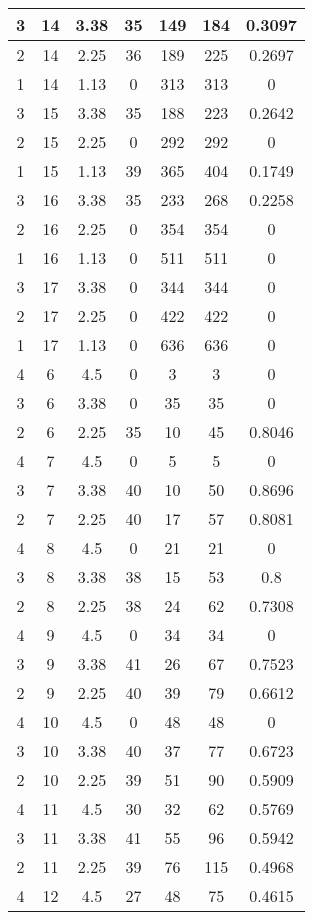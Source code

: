 \documentclass[letterpaper, 12pt]{article}
\begin{document}
\begin{longtable}{|c|c|c|c|c|c|c|}
\hline
3 & 14 & 3.38 & 35 & 149 & 184 & 0.3097 \\
\hline
2 & 14 & 2.25 & 36 & 189 & 225 & 0.2697 \\
\hline
1 & 14 & 1.13 & 0 & 313 & 313 & 0 \\
\hline
3 & 15 & 3.38 & 35 & 188 & 223 & 0.2642 \\
\hline
2 & 15 & 2.25 & 0 & 292 & 292 & 0 \\
\hline
1 & 15 & 1.13 & 39 & 365 & 404 & 0.1749 \\
\hline
3 & 16 & 3.38 & 35 & 233 & 268 & 0.2258 \\
\hline
2 & 16 & 2.25 & 0 & 354 & 354 & 0 \\
\hline
1 & 16 & 1.13 & 0 & 511 & 511 & 0 \\
\hline
3 & 17 & 3.38 & 0 & 344 & 344 & 0 \\
\hline
2 & 17 & 2.25 & 0 & 422 & 422 & 0 \\
\hline
1 & 17 & 1.13 & 0 & 636 & 636 & 0 \\
\hline
4 & 6 & 4.5 & 0 & 3 & 3 & 0 \\
\hline
3 & 6 & 3.38 & 0 & 35 & 35 & 0 \\
\hline
2 & 6 & 2.25 & 35 & 10 & 45 & 0.8046 \\
\hline
4 & 7 & 4.5 & 0 & 5 & 5 & 0 \\
\hline
3 & 7 & 3.38 & 40 & 10 & 50 & 0.8696 \\
\hline
2 & 7 & 2.25 & 40 & 17 & 57 & 0.8081 \\
\hline
4 & 8 & 4.5 & 0 & 21 & 21 & 0 \\
\hline
3 & 8 & 3.38 & 38 & 15 & 53 & 0.8 \\
\hline
2 & 8 & 2.25 & 38 & 24 & 62 & 0.7308 \\
\hline
4 & 9 & 4.5 & 0 & 34 & 34 & 0 \\
\hline
3 & 9 & 3.38 & 41 & 26 & 67 & 0.7523 \\
\hline
2 & 9 & 2.25 & 40 & 39 & 79 & 0.6612 \\
\hline
4 & 10 & 4.5 & 0 & 48 & 48 & 0 \\
\hline
3 & 10 & 3.38 & 40 & 37 & 77 & 0.6723 \\
\hline
2 & 10 & 2.25 & 39 & 51 & 90 & 0.5909 \\
\hline
4 & 11 & 4.5 & 30 & 32 & 62 & 0.5769 \\
\hline
3 & 11 & 3.38 & 41 & 55 & 96 & 0.5942 \\
\hline
2 & 11 & 2.25 & 39 & 76 & 115 & 0.4968 \\
\hline
4 & 12 & 4.5 & 27 & 48 & 75 & 0.4615 \\

\end{longtable}
\end{document}
